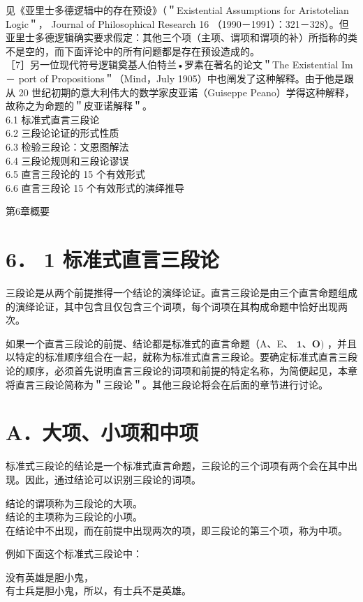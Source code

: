 见《亚里士多德逻辑中的存在预设》（＂Existential Assumptions for Aristotelian Logic＂， Journal of Philosophical Research 16 （1990－1991）：321－328）。但亚里士多德逻辑确实要求假定：其他三个项（主项、谓项和谓项的补）所指称的类不是空的，而下面评论中的所有问题都是存在预设造成的。\\
［7］另一位现代符号逻辑奠基人伯特兰•罗素在著名的论文＂The Existential Im－ port of Propositions＂（Mind，July 1905）中也阐发了这种解释。由于他是跟从 20 世纪初期的意大利伟大的数学家皮亚诺（Guiseppe Peano）学得这种解释，故称之为命题的＂皮亚诺解释＂。\\
6.1 标准式直言三段论\\
6.2 三段论论证的形式性质\\
6.3 检验三段论：文恩图解法\\
6.4 三段论规则和三段论谬误\\
6.5 直言三段论的 15 个有效形式\\
6.6 直言三段论 15 个有效形式的演绎推导

第6章概要

\section*{6． 1 标准式直言三段论}
三段论是从两个前提推得一个结论的演绎论证。直言三段论是由三个直言命题组成的演绎论证，其中包含且仅包含三个词项，每个词项在其构成命题中恰好出现两次。

如果一个直言三段论的前提、结论都是标准式的直言命题（A、E、 $\mathbf{1} 、 \mathbf{O})$ ，并且以特定的标准顺序组合在一起，就称为标准式直言三段论。要确定标准式直言三段论的顺序，必须首先说明直言三段论的词项和前提的特定名称，为简便起见，本章将直言三段论简称为＂三段论＂。其他三段论将会在后面的章节进行讨论。

\section*{A．大项、小项和中项}
标准式三段论的结论是一个标准式直言命题，三段论的三个词项有两个会在其中出现。因此，通过结论可以识别三段论的词项。

结论的谓项称为三段论的大项。\\
结论的主项称为三段论的小项。\\
在结论中不出现，而在前提中出现两次的项，即三段论的第三个项，称为中项。

例如下面这个标准式三段论中：

\begin{displayquote}
没有英雄是胆小鬼，\\
有士兵是胆小鬼，所以，有士兵不是英雄。
\end{displayquote}

